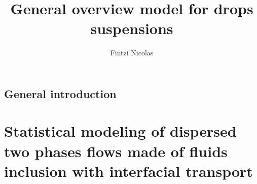 \documentclass[12pt,a4paper,oneside,openany]{My_book}
\title{General overview model for drops suspensions}
\author{Fintzi Nicolas}
\begin{document}
\dominitoc

\frontmatter
\pagestyle{plain}




\mainmatter

\adjustmtc


\chapter{General introduction}
\label{part:intro}

\minitoc



\part{Statistical modeling of dispersed two phases flows made of fluids inclusion with interfacial transport}
\label{part:one}

\end{document}

